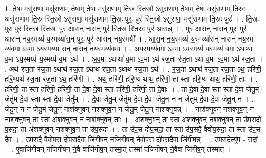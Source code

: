 \documentclass[17pt]{extarticle}
\begin{document}
1. तेषा॒ मसु॑राणा॒ मसु॑राणा॒म् तेषा॒म् तेषा॒ मसु॑राणाम् ति॒स्र स्ति॒स्रो ऽसु॑राणा॒म् तेषा॒म् तेषा॒ मसु॑राणाम् ति॒स्रः । . असु॑राणाम् ति॒स्र स्ति॒स्रो ऽसु॑राणा॒ मसु॑राणाम् ति॒स्रः पुरः॒ पुर॑ स्ति॒स्रो ऽसु॑राणा॒ मसु॑राणाम् ति॒स्रः पुरः॑ । . ति॒स्रः पुरः॒ पुर॑ स्ति॒स्र स्ति॒स्रः पुर॑ आसन् नास॒न् पुर॑ स्ति॒स्र स्ति॒स्रः पुर॑ आसन्न् । . पुर॑ आसन् नास॒न् पुरः॒ पुर॑ आसन् नय॒स्मय्य॑ य॒स्मय्या॑स॒न् पुरः॒ पुर॑ आसन् नय॒स्मयी᳚ । . आ॒स॒न् न॒य॒स्मय्य॑ य॒स्मय्या॑सन् नासन् नय॒स्म य्य॑व॒मा ऽव॒मा ऽय॒स्मय्या॑ सन् नासन् 
नय॒स्मय्य॑व॒मा । . अ॒य॒स्मय्य॑व॒मा ऽव॒मा ऽय॒स्मय्य॑ य॒स्मय्य॑ व॒मा ऽथाथा॑ व॒मा ऽय॒स्मय्य॑ य॒स्मय्य॑ व॒मा ऽथ॑ । . अ॒व॒मा ऽथाथा॑ व॒मा ऽव॒मा ऽथ॑ रज॒ता र॑ज॒ता ऽथा॑ व॒मा ऽव॒मा ऽथ॑ रज॒ता । . अथ॑ रज॒ता र॑ज॒ता ऽथाथ॑ रज॒ता ऽथाथ॑ रज॒ता ऽथाथ॑ रज॒ता ऽथ॑ । . र॒ज॒ता ऽथाथ॑ रज॒ता र॑ज॒ता ऽथ॒ हरि॑णी॒ हरि॒ण्यथ॑ रज॒ता र॑ज॒ता ऽथ॒ हरि॑णी । . अथ॒ हरि॑णी॒ हरि॒ण्य थाथ॒ हरि॑णी॒ ता स्ता हरि॒ण्य थाथ॒ हरि॑णी॒ ताः । . हरि॑णी॒ ता स्ता हरि॑णी॒ हरि॑णी॒ ता दे॒वा दे॒वा स्ता हरि॑णी॒ हरि॑णी॒ ता दे॒वाः । . ता दे॒वा दे॒वा स्ता स्ता दे॒वा जेतु॒म् जेतु॑म् दे॒वा स्ता स्ता दे॒वा जेतु᳚म् । . दे॒वा जेतु॒म् जेतु॑म् दे॒वा दे॒वा जेतु॒न् न न जेतु॑म् दे॒वा दे॒वा जेतु॒न् न । . जेतु॒न् न न जेतु॒म् जेतु॒न् नाश॑क्नुवन् नशक्नुव॒न् न जेतु॒म् जेतु॒न् नाश॑क्नुवन्न् । . नाश॑क्नुवन् नशक्नुव॒न् न नाश॑क्नुव॒न् ता स्ता अ॑शक्नुव॒न् न नाश॑क्नुव॒न् ताः । . अ॒श॒क्नु॒व॒न् ता स्ता अ॑शक्नुवन् नशक्नुव॒न् ता उ॑प॒सदो॑ प॒सदा॒ ता अ॑शक्नुवन् नशक्नुव॒न् ता उ॑प॒सदा᳚ । . ता उ॑प॒स दो॑प॒सदा॒ ता स्ता उ॑प॒सदै॒ वैवोप॒सदा॒ ता स्ता उ॑प॒स दै॒व । . उ॒प॒सदै॒ वैवोप॒स दो॑प॒सदै॒वा जि॑गीषन् नजिगीषन् ने॒वोप॒स दो॑प॒सदै॒वा जि॑गीषन्न् । . उ॒प॒सदेत्यु॑प - सदा᳚ । . ए॒वाजि॑गीषन् नजिगीषन् ने॒वै वाजि॑गीष॒न् तस्मा॒त् तस्मा॑ दजिगीषन् ने॒वैवा जि॑गीष॒न् तस्मा᳚त् । \newline
\end{document}
